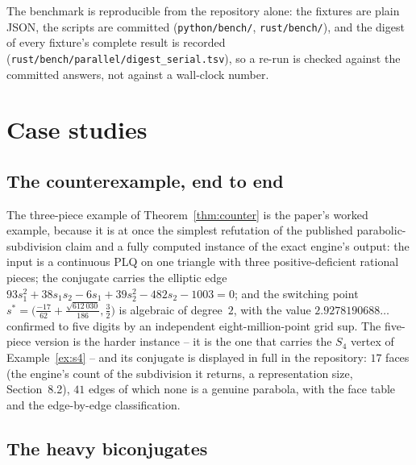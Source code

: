 \documentclass[11pt]{article}
\theoremstyle{definition}
\begin{document}
The benchmark is reproducible from the repository alone: the fixtures are
plain JSON, the scripts are committed (\texttt{python/bench/},
\texttt{rust/bench/}), and the digest of every fixture's complete result is
recorded (\texttt{rust/bench/parallel/digest\_serial.tsv}), so a re-run is
checked against the committed answers, not against a wall-clock number.

\section{Case studies}

\subsection{The counterexample, end to end}

The three-piece example of Theorem~\ref{thm:counter} is the paper's worked
example, because it is at once the simplest refutation of the published
parabolic-subdivision claim and a fully computed instance of the exact engine's
output: the input is a continuous PLQ on one triangle with three
positive-deficient rational pieces; the conjugate carries the elliptic edge
$93s_1^2+38s_1s_2-6s_1+39s_2^2-482s_2-1003=0$; and the switching point
$s^*=\bigl(\frac{-17}{62}+\frac{\sqrt{612\,030}}{186},\frac32\bigr)$ is
algebraic of degree~$2$, with the value $2.9278190688\ldots$ confirmed to five
digits by an independent eight-million-point grid sup.
 The five-piece
version is the harder instance -- it is the one that carries the $S_4$ vertex
of Example~\ref{ex:s4} -- and its conjugate is displayed in full in the
repository: $17$ faces (the engine's count of the subdivision it returns, a
representation size, Section~8.2), $41$ edges of which none is a genuine parabola, with
the face table and the edge-by-edge classification.

\subsection{The heavy biconjugates}
\end{document}
